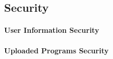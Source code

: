 \subsection{Security}
\paragraph*{User Information Security}

\paragraph*{Uploaded Programs Security}

